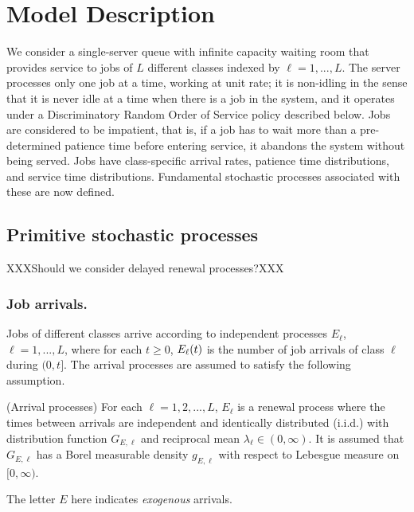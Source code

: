 \documentclass[stsy]{informs-stsy}
\begin{document}
\section{Model Description}

We consider a single-server queue with infinite capacity waiting room that provides service to jobs of $L$ different classes indexed by $\ell=1,...,L$. The server processes only one job at a time, working at unit rate; it is non-idling in the sense that it is never idle at a time when there is a job in the system, and it operates under a Discriminatory Random Order of Service policy described below. Jobs are considered to be impatient, that is, if a job has to wait more than a pre-determined patience time before entering service, it abandons the system without being served. Jobs have class-specific arrival rates, patience time distributions, and service time distributions. Fundamental stochastic processes associated with these are now defined.


\subsection{Primitive stochastic processes}\label{sec_model}

XXXShould we consider delayed renewal processes?XXX

\subsubsection*{Job arrivals.}
Jobs of different classes arrive according to independent processes $E_\ell$, $\ell=1,...,L$, where for each $t\geq0$, $E_\ell(t)$ is the number of job arrivals of class $\ell$ during $(0,t]$. The arrival processes are assumed to satisfy the following assumption.

\begin{assumption}\label{asm_arrival}
(Arrival processes) For each $\ell=1,2,...,L$, $E_\ell$ is a renewal process where the times between arrivals are independent and identically distributed  (i.i.d.) with distribution function $G_{E,\ell}$ and reciprocal mean $\lambda_\ell\in(0,\infty)$. It is assumed that $G_{E,\ell}$ has a Borel measurable density $g_{E,\ell}$ with respect to Lebesgue measure on $[0,\infty)$.  
\end{assumption}
\noindent The letter $E$ here indicates \textit{exogenous} arrivals. 
\end{document}

